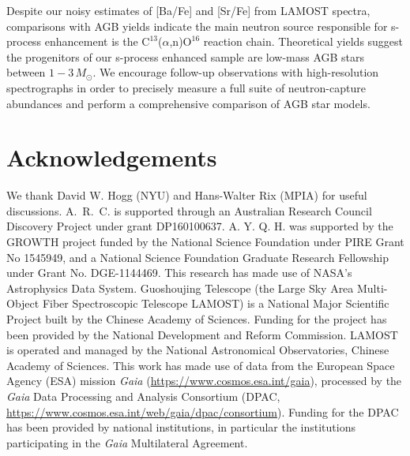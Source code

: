\documentclass[a4paper,fleqn,usenatbib]{mnras}
\begin{document}
Despite our noisy estimates of [Ba/Fe] and [Sr/Fe] from LAMOST spectra, comparisons with AGB yields indicate the main neutron source responsible for s-process enhancement is the $\text{C}^{13}$(\textrm{$\alpha$},n)$\text{O}^{16}$ reaction chain. Theoretical yields suggest the progenitors of our s-process enhanced sample are low-mass AGB stars between $1 - 3\,M_{\odot}$. We encourage follow-up observations with high-resolution spectrographs in order to precisely measure a full suite of neutron-capture abundances and perform a comprehensive comparison of AGB star models.

 

\section*{Acknowledgements}
We thank David W. Hogg (NYU) and Hans-Walter Rix (MPIA) for useful discussions. 
A.~R.~C. is supported through an Australian Research Council Discovery Project under grant DP160100637.
A. Y. Q. H. was supported by the GROWTH project funded by the National Science Foundation under PIRE Grant No 1545949, and a National Science Foundation Graduate Research Fellowship under Grant No. DGE-1144469. 
This research has made use of NASA's Astrophysics Data System.
Guoshoujing Telescope (the Large Sky Area Multi-Object Fiber Spectroscopic Telescope LAMOST) is a National Major Scientific Project built by the Chinese Academy of Sciences. Funding for the project has been provided by the National Development and Reform Commission. LAMOST is operated and managed by the National Astronomical Observatories, Chinese Academy of Sciences. 
This work has made use of data from the European Space Agency (ESA) mission
{\it Gaia} (\url{https://www.cosmos.esa.int/gaia}), processed by the {\it Gaia}
Data Processing and Analysis Consortium (DPAC,
\url{https://www.cosmos.esa.int/web/gaia/dpac/consortium}). Funding for the DPAC
has been provided by national institutions, in particular the institutions
participating in the {\it Gaia} Multilateral Agreement.


 

\end{document}
